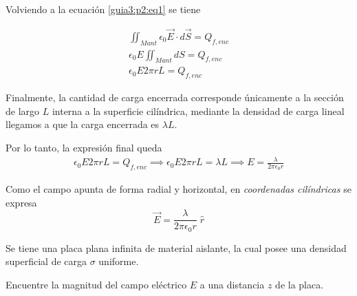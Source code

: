 \documentclass[11pt]{article}
\begin{document}
\begin{solucion}
    Volviendo a la ecuación \ref{guia3:p2:eq1} se tiene

    \begin{gather}
        \iint_{Mant} \epsilon_0 \vec{E} \cdot d\vec{S} = Q_{f, enc}
        \\
        \epsilon_0E \iint_{Mant}dS = Q_{f, enc}
        \\
        \epsilon_0E 2\pi rL = Q_{f, enc}
    \end{gather}

    Finalmente, la cantidad de carga encerrada corresponde únicamente a la sección de largo $L$ interna a la superficie cilíndrica, mediante la densidad de carga lineal llegamos a que la carga encerrada es $\lambda L$.

    Por lo tanto, la expresión final queda
    \begin{gather}
        \epsilon_0E 2\pi rL = Q_{f, enc} \implies \epsilon_0E 2\pi rL = \lambda L \implies E = \frac{\lambda}{2\pi\epsilon_0 r}
    \end{gather}

    Como el campo apunta de forma radial y horizontal, en \textit{coordenadas cilíndricas} se expresa
    \begin{equation}
        \vec{E} = \frac{\lambda}{2\pi\epsilon_0 r} \;\hat{r}
    \end{equation}
\end{solucion}

Se tiene una placa plana infinita de material aislante, la cual posee una densidad superficial de carga $\sigma$ uniforme.

Encuentre la magnitud del campo eléctrico $E$ a una distancia $z$ de la placa.

\begin{figure}[H]
    \centering
    \shorthandoff{>}
    \shorthandon{>}
\end{figure}
\end{document}
